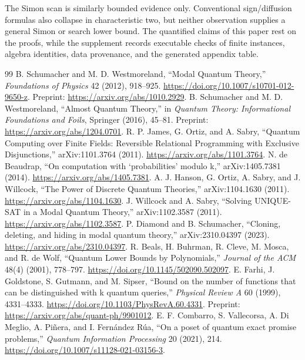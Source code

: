 \documentclass[11pt]{article}
\begin{document}
The Simon scan is similarly bounded evidence only. Conventional sign/diffusion formulas also collapse in characteristic two, but neither observation supplies a general Simon or search lower bound. The quantified claims of this paper rest on the proofs, while the supplement records executable checks of finite instances, algebra identities, data provenance, and the generated appendix table.

\begin{thebibliography}{99}
 B. Schumacher and M. D. Westmoreland, ``Modal Quantum Theory,'' \emph{Foundations of Physics} 42 (2012), 918--925. \url{https://doi.org/10.1007/s10701-012-9650-z}. Preprint: \url{https://arxiv.org/abs/1010.2929}.
 B. Schumacher and M. D. Westmoreland, ``Almost Quantum Theory,'' in \emph{Quantum Theory: Informational Foundations and Foils}, Springer (2016), 45--81. Preprint: \url{https://arxiv.org/abs/1204.0701}.
 R. P. James, G. Ortiz, and A. Sabry, ``Quantum Computing over Finite Fields: Reversible Relational Programming with Exclusive Disjunctions,'' arXiv:1101.3764 (2011). \url{https://arxiv.org/abs/1101.3764}.
 N. de Beaudrap, ``On computation with `probabilities' modulo k,'' arXiv:1405.7381 (2014). \url{https://arxiv.org/abs/1405.7381}.
 A. J. Hanson, G. Ortiz, A. Sabry, and J. Willcock, ``The Power of Discrete Quantum Theories,'' arXiv:1104.1630 (2011). \url{https://arxiv.org/abs/1104.1630}.
 J. Willcock and A. Sabry, ``Solving UNIQUE-SAT in a Modal Quantum Theory,'' arXiv:1102.3587 (2011). \url{https://arxiv.org/abs/1102.3587}.
 P. Diamond and B. Schumacher, ``Cloning, deleting, and hiding in modal quantum theory,'' arXiv:2310.04397 (2023). \url{https://arxiv.org/abs/2310.04397}.
 R. Beals, H. Buhrman, R. Cleve, M. Mosca, and R. de Wolf, ``Quantum Lower Bounds by Polynomials,'' \emph{Journal of the ACM} 48(4) (2001), 778--797. \url{https://doi.org/10.1145/502090.502097}.
 E. Farhi, J. Goldstone, S. Gutmann, and M. Sipser, ``Bound on the number of functions that can be distinguished with k quantum queries,'' \emph{Physical Review A} 60 (1999), 4331--4333. \url{https://doi.org/10.1103/PhysRevA.60.4331}. Preprint: \url{https://arxiv.org/abs/quant-ph/9901012}.
 E. F. Combarro, S. Vallecorsa, A. Di Meglio, A. Pi\~nera, and I. Fern\'andez R\'ua, ``On a poset of quantum exact promise problems,'' \emph{Quantum Information Processing} 20 (2021), 214. \url{https://doi.org/10.1007/s11128-021-03156-3}.

\end{thebibliography}
\end{document}
